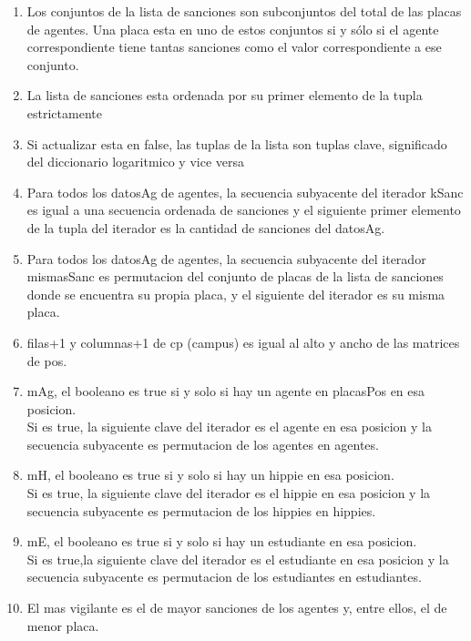 \begin{Representacion}
\begin{enumerate}
		\item Los conjuntos de la lista de sanciones son subconjuntos del total de las placas de agentes. Una placa esta en uno de estos conjuntos si y sólo si el agente correspondiente tiene tantas sanciones como el valor correspondiente a ese conjunto.
		\item La lista de sanciones esta ordenada por su primer elemento de la tupla estrictamente
		\item Si actualizar esta en false, las tuplas de la lista son tuplas clave, significado del diccionario logaritmico y vice versa		
		
		\item Para todos los datosAg de agentes, la secuencia subyacente del iterador kSanc es igual a una secuencia ordenada de sanciones y el siguiente primer elemento de la tupla del iterador es la cantidad de sanciones del datosAg.
		\item Para todos los datosAg de agentes, la secuencia subyacente del iterador mismasSanc es permutacion del conjunto de placas de la lista de sanciones donde se encuentra su propia placa, y el siguiente del iterador es su misma placa.
		\item filas+1 y columnas+1 de cp (campus) es igual al alto y ancho de las matrices de pos.
		\item mAg, el booleano es true si y solo si hay un agente en placasPos en esa posicion.\\
		Si es true, la siguiente clave del iterador es el agente en esa posicion y la secuencia subyacente es permutacion de los agentes en agentes.
		\item mH, el booleano es true si y solo si hay un hippie en esa posicion.\\
		Si es true, la siguiente clave del iterador es el hippie en esa posicion y la secuencia subyacente es permutacion de los hippies en hippies.
		\item mE, el booleano es true si y solo si hay un estudiante en esa posicion.\\
		Si es true,la siguiente clave del iterador es el estudiante en esa posicion y la secuencia subyacente es permutacion de los estudiantes en estudiantes.
		\item El mas vigilante es el de mayor sanciones de los agentes y, entre ellos, el de menor placa.
	\end{enumerate}
	

\end{Representacion}
